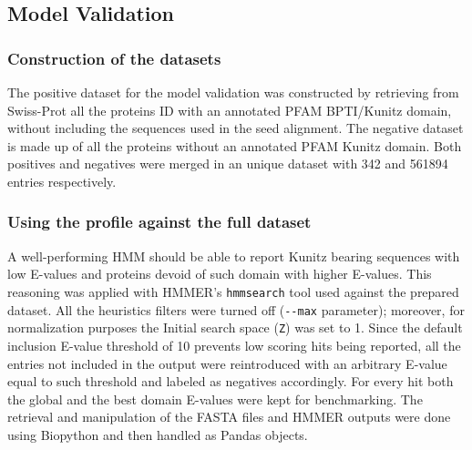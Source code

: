 \documentclass[nocrop]{bioinfo}
\begin{document}
\begin{methods}
\subsection{Model Validation} 
\subsubsection{Construction of the datasets}
The positive dataset for the model validation was constructed by retrieving from Swiss-Prot all the proteins ID with an annotated PFAM BPTI/Kunitz domain, without including the sequences used in the seed alignment. 
The negative dataset is made up of all the proteins without an annotated PFAM Kunitz domain. 
Both positives and negatives were merged in an unique dataset with 342 and 561894 entries respectively.

\subsubsection{Using the profile against the full dataset}
A well-performing HMM should be able to report Kunitz bearing sequences with low E-values and proteins devoid of such domain with higher E-values.
This reasoning was applied with HMMER’s \texttt{hmmsearch} tool used against the prepared dataset. 
All the heuristics filters were turned off (\texttt{-{}-max} parameter); moreover, for normalization purposes the Initial search space (\texttt{Z}) was set to 1. 
Since the default inclusion E-value threshold of 10 prevents low scoring hits being reported, all the entries not included in the output were reintroduced with an arbitrary E-value equal to such threshold and labeled as negatives accordingly. 
For every hit both the global and the best domain E-values were kept for benchmarking. 
The retrieval and manipulation of the FASTA files and HMMER outputs were done using Biopython \citep{biopython2009} and then handled as Pandas \citep{pandas2020} objects.  


\end{methods}
\end{document}
